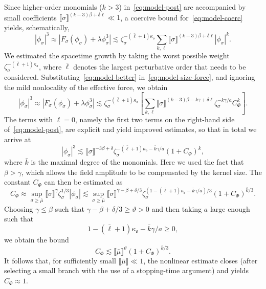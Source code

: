 \documentclass{article}
\numberwithin{equation}{section}
\theoremstyle{plain}
\theoremstyle{definition}
\begin{document}
Since higher-order monomials ($k > 3$) in~\eqref{eq:model-post} are
accompanied by small coefficients $\llbracket \sigma \rrbracket^{(k - 3) \beta
+ \delta \ell} \ll 1$, a coercive bound for~\eqref{eq:model-coerc} yields,
schematically,
\begin{equation}
  | \phi_{\sigma} |^3 \approx | F_{\sigma} (\phi_{\sigma}) + \lambda
  \phi_{\sigma}^3 | \lesssim \zeta_{\sigma}^{- (\bar{\ell} + 1)
  \kappa_{\mathfrak{o}}} \sum_{k, \ell} \llbracket \sigma \rrbracket^{(k - 3)
  \beta + \delta \ell} | \phi_{\sigma} |^k . \label{eq:model-size-force}
\end{equation}
We estimated the spacetime growth by taking the worst possible weight
$\zeta_{\sigma}^{- (\bar{\ell} + 1) \kappa_{\mathfrak{o}}}$, where
$\bar{\ell}$ denotes the largest perturbative order that needs to be
considered. Substituting~\eqref{eq:model-better}
in~\eqref{eq:model-size-force}, and ignoring the mild nonlocality of the
effective force, we obtain
\[ | \phi_{\sigma} |^3 \approx | F_{\sigma} (\phi_{\sigma}) + \lambda
   \phi_{\sigma}^3 | \lesssim \zeta_{\sigma}^{- (\bar{\ell} + 1)
   \kappa_{\mathfrak{o}}} \left[ \sum_{k, \ell} \llbracket \sigma
   \rrbracket^{(k - 3) \beta -  k \gamma + \delta \ell} \zeta_{\sigma}^{- k
   \gamma / a} C_{\Phi}^k \right] . \]
The terms with $\ell = 0$, namely the first two terms on the right-hand side
of~\eqref{eq:model-post}, are explicit and yield improved estimates, so that
in total we arrive at
\begin{equation}
  | \phi_{\sigma} |^3 \lesssim \llbracket \sigma \rrbracket^{- 3 \beta +
  \delta} \zeta_{\sigma}^{- (\bar{\ell} + 1) \kappa_{\mathfrak{o}} - \bar{k}
  \gamma / a}  (1 + C_{\Phi})^{\bar{k}}, \label{eq:rough-estimate}
\end{equation}
where $\bar{k}$ is the maximal degree of the monomials. Here we used the fact
that $\beta > \gamma$, which allows the field amplitude to be compensated by
the kernel size. The constant $C_{\Phi}$ can then be estimated as
\[ C_{\Phi} \approx \sup_{\sigma \geqslant \bar{\mu}}  \llbracket \sigma
   \rrbracket^{\gamma} \zeta_{\sigma}^{1 / 3}  | \phi_{\sigma} | \lesssim \sup_{\sigma \geqslant \bar{\mu}}
   \llbracket \sigma \rrbracket^{\gamma - \beta + \delta / 3}
   \zeta_{\sigma}^{(1 - (\bar{\ell} + 1) \kappa_{\mathfrak{o}} - \bar{k}
   \gamma / a) / 3}  (1 + C_{\Phi})^{\bar{k} / 3} . \]
Choosing $\gamma \leqslant \beta$ such that $\gamma - \beta + \delta / 3
\geqslant \vartheta > 0$ and then taking $a$ large enough such that
\[ 1 - (\bar{\ell} + 1) \kappa_{\mathfrak{o}} - \bar{k} \gamma / a \geqslant
   0, \]
we obtain the bound
\[ C_{\Phi} \lesssim \llbracket \bar{\mu} \rrbracket^{\vartheta}  (1 +
   C_{\Phi})^{\bar{k} / 3} . \]
It follows that, for sufficiently small $\llbracket \bar{\mu} \rrbracket \ll
1$, the nonlinear estimate closes (after selecting a small branch with the use of a stopping-time argument) and yields $C_{\Phi} \approx 1$.
\end{document}

